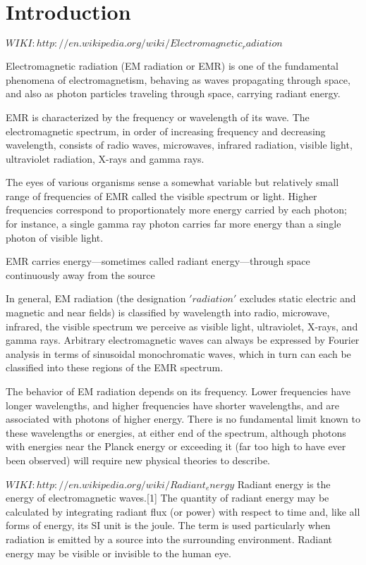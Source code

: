 \section{Introduction}



$WIKI: http://en.wikipedia.org/wiki/Electromagnetic_radiation$

Electromagnetic radiation (EM radiation or EMR) is one of the fundamental phenomena of electromagnetism, behaving as waves propagating through space, and also as photon particles traveling through space, carrying radiant energy.

EMR is characterized by the frequency or wavelength of its wave. The electromagnetic spectrum, in order of increasing frequency and decreasing wavelength, consists of radio waves, microwaves, infrared radiation, visible light, ultraviolet radiation, X-rays and gamma rays. 

The eyes of various organisms sense a somewhat variable but relatively small range of frequencies of EMR called the visible spectrum or light. Higher frequencies correspond to proportionately more energy carried by each photon; for instance, a single gamma ray photon carries far more energy than a single photon of visible light.

EMR carries energy—sometimes called radiant energy—through space continuously away from the source

In general, EM radiation (the designation $'radiation'$ excludes static electric and magnetic and near fields) is classified by wavelength into radio, microwave, infrared, the visible spectrum we perceive as visible light, ultraviolet, X-rays, and gamma rays. Arbitrary electromagnetic waves can always be expressed by Fourier analysis in terms of sinusoidal monochromatic waves, which in turn can each be classified into these regions of the EMR spectrum.

The behavior of EM radiation depends on its frequency. Lower frequencies have longer wavelengths, and higher frequencies have shorter wavelengths, and are associated with photons of higher energy. There is no fundamental limit known to these wavelengths or energies, at either end of the spectrum, although photons with energies near the Planck energy or exceeding it (far too high to have ever been observed) will require new physical theories to describe.

$WIKI: http://en.wikipedia.org/wiki/Radiant_energy$
Radiant energy is the energy of electromagnetic waves.[1] The quantity of radiant energy may be calculated by integrating radiant flux (or power) with respect to time and, like all forms of energy, its SI unit is the joule. The term is used particularly when radiation is emitted by a source into the surrounding environment. Radiant energy may be visible or invisible to the human eye.


